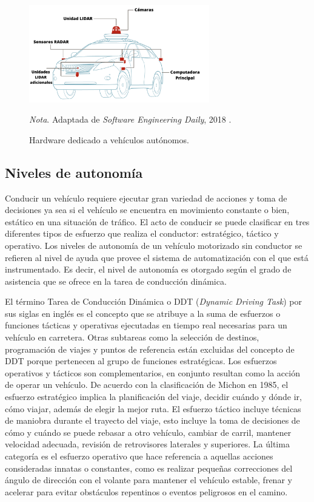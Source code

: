 \begin{figure}
    \centering
    \includegraphics[width=0.7\textwidth]{Figures/Figures_Cap02/self_driving_car.png}
    \caption{Hardware dedicado a vehículos autónomos.}
    \textit{Nota}. Adaptada de \textit{Software Engineering Daily}, 2018 \cite{SoftwareEngineeringDaily}.
    \label{fig:self_driving_car}
\end{figure}

\subsection{Niveles de autonomía} \label{sub:niveles_de_autonomía}

Conducir un vehículo requiere ejecutar gran variedad de acciones y toma de decisiones ya sea si el vehículo se encuentra en movimiento constante o bien, estático en una situación de tráfico. El acto de conducir se puede clasificar en tres diferentes tipos de esfuerzo que realiza el conductor: estratégico, táctico y operativo\cite{michon1985critical}. Los niveles de autonomía de un vehículo motorizado sin conductor se refieren al nivel de ayuda que provee el sistema de automatización con el que está instrumentado. Es decir, el nivel de autonomía es otorgado según el grado de asistencia que se ofrece en la tarea de conducción dinámica.

El término Tarea de Conducción Dinámica o DDT (\textit{Dynamic Driving Task}) por sus siglas en inglés es el concepto que se atribuye a la suma de esfuerzos o funciones tácticas y operativas ejecutadas en tiempo real necesarias para un vehículo en carretera. Otras subtareas como la selección de destinos, programación de viajes y puntos de referencia están excluidas del concepto de DDT porque pertenecen al grupo de funciones estratégicas. Los esfuerzos operativos y tácticos son complementarios, en conjunto resultan como la acción de operar un vehículo\cite{sae2021surface}. De acuerdo con la clasificación de Michon en 1985, el esfuerzo estratégico implica la planificación del viaje, decidir cuándo y dónde ir, cómo viajar, además de elegir la mejor ruta. El esfuerzo táctico incluye técnicas de maniobra durante el trayecto del viaje, esto incluye la toma de decisiones de cómo y cuándo se puede rebasar a otro vehículo, cambiar de carril, mantener velocidad adecuada, revisión de retrovisores laterales y superiores. La última categoría es el esfuerzo operativo que hace referencia a aquellas acciones consideradas innatas o constantes, como es realizar pequeñas correcciones del ángulo de dirección con el volante para mantener el vehículo estable, frenar y acelerar para evitar obstáculos repentinos o eventos peligrosos en el camino\cite{michon1985critical}. 

